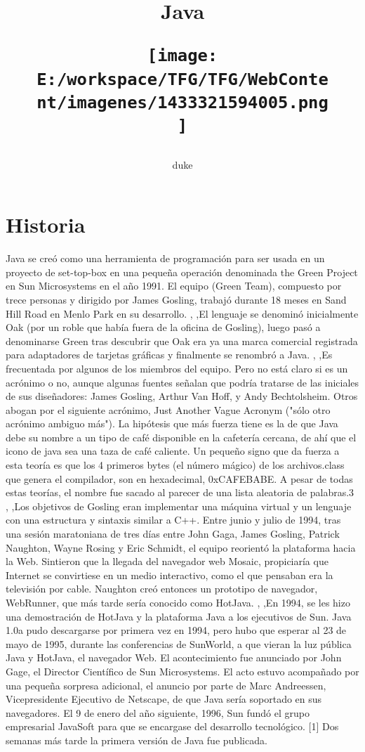 \documentclass[11pt,a4paper]{book}
\title{\Huge{\textbf{Java}}
\begin{figure}[hbtp]
		\centering
		\texttt{[image: E:/workspace/TFG/TFG/WebContent/imagenes/1433321594005.png]}
	\end{figure}}
\author{duke}
\begin{document}
\maketitle

\tableofcontents


			\chapter{Historia}
												Java se creó como una herramienta de programación para ser usada en un proyecto de set-top-box en una pequeña operación denominada the Green Project en Sun Microsystems en el año 1991. El equipo (Green Team), compuesto por trece personas y dirigido por James Gosling, trabajó durante 18 meses en Sand Hill Road en Menlo Park en su desarrollo.
	\bigskip
							,
	\bigskip
							,El lenguaje se denominó inicialmente Oak (por un roble que había fuera de la oficina de Gosling), luego pasó a denominarse Green tras descubrir que Oak era ya una marca comercial registrada para adaptadores de tarjetas gráficas y finalmente se renombró a Java.
	\bigskip
							,
	\bigskip
							,Es frecuentada por algunos de los miembros del equipo. Pero no está claro si es un acrónimo o no, aunque algunas fuentes señalan que podría tratarse de las iniciales de sus diseñadores: James Gosling, Arthur Van Hoff, y Andy Bechtolsheim. Otros abogan por el siguiente acrónimo, Just Another Vague Acronym ("sólo otro acrónimo ambiguo más"). La hipótesis que más fuerza tiene es la de que Java debe su nombre a un tipo de café disponible en la cafetería cercana, de ahí que el icono de java sea una taza de café caliente. Un pequeño signo que da fuerza a esta teoría es que los 4 primeros bytes (el número mágico) de los archivos.class que genera el compilador, son en hexadecimal, 0xCAFEBABE. A pesar de todas estas teorías, el nombre fue sacado al parecer de una lista aleatoria de palabras.3
	\bigskip
							,
	\bigskip
							,Los objetivos de Gosling eran implementar una máquina virtual y un lenguaje con una estructura y sintaxis similar a C++. Entre junio y julio de 1994, tras una sesión maratoniana de tres días entre John Gaga, James Gosling, Patrick Naughton, Wayne Rosing y Eric Schmidt, el equipo reorientó la plataforma hacia la Web. Sintieron que la llegada del navegador web Mosaic, propiciaría que Internet se convirtiese en un medio interactivo, como el que pensaban era la televisión por cable. Naughton creó entonces un prototipo de navegador, WebRunner, que más tarde sería conocido como HotJava.
	\bigskip
							,
	\bigskip
							,En 1994, se les hizo una demostración de HotJava y la plataforma Java a los ejecutivos de Sun. Java 1.0a pudo descargarse por primera vez en 1994, pero hubo que esperar al 23 de mayo de 1995, durante las conferencias de SunWorld, a que vieran la luz pública Java y HotJava, el navegador Web. El acontecimiento fue anunciado por John Gage, el Director Científico de Sun Microsystems. El acto estuvo acompañado por una pequeña sorpresa adicional, el anuncio por parte de Marc Andreessen, Vicepresidente Ejecutivo de Netscape, de que Java sería soportado en sus navegadores. El 9 de enero del año siguiente, 1996, Sun fundó el grupo empresarial JavaSoft para que se encargase del desarrollo tecnológico. [1] Dos semanas más tarde la primera versión de Java fue publicada.
\end{document}
